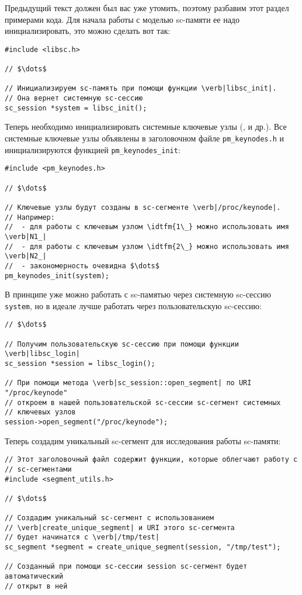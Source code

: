 Предыдущий текст должен был вас уже утомить, поэтому разбавим этот
раздел примерами кода. Для начала работы с моделью sc-памяти ее надо
инициализировать, это можно сделать вот так:

\begin{lstlisting}[texcl]
#include <libsc.h>

// $\dots$

// Инициализируем sc-память при помощи функции \verb|libsc_init|.
// Она вернет системную sc-сессию
sc_session *system = libsc_init();
\end{lstlisting}

Теперь необходимо инициализировать системные ключевые узлы (,
 и др.). Все системные ключевые узлы объявлены в заголовочном
файле \verb|pm_keynodes.h| и инициализируются функцией
\lstinline{pm_keynodes_init}:

\begin{lstlisting}[texcl]
#include <pm_keynodes.h>

// $\dots$

// Ключевые узлы будут созданы в sc-сегменте \verb|/proc/keynode|.
// Например:
//  - для работы с ключевым узлом \idtfm{1\_} можно использовать имя \verb|N1_|
//  - для работы с ключевым узлом \idtfm{2\_} можно использовать имя \verb|N2_|
//  - закономерность очевидна $\dots$
pm_keynodes_init(system);
\end{lstlisting}

В принципе уже можно работать с sc-памятью через системную sc-сессию
\lstinline{system}, но в идеале лучше работать через пользовательскую
sc-сессию:

\begin{lstlisting}[texcl]
// $\dots$

// Получим пользовательскую sc-сессию при помощи функции \verb|libsc_login|
sc_session *session = libsc_login();

// При помощи метода \verb|sc_session::open_segment| по URI "/proc/keynode"
// откроем в нашей пользовательской sc-сессии sc-сегмент системных
// ключевых узлов
session->open_segment("/proc/keynode");
\end{lstlisting}

Теперь создадим уникальный sc-сегмент для исследования работы
sc-памяти:

\begin{lstlisting}[texcl]
// Этот заголовочный файл содержит функции, которые облегчают работу с
// sc-сегментами
#include <segment_utils.h>

// $\dots$

// Создадим уникальный sc-сегмент с использованием
// \verb|create_unique_segment| и URI этого sc-сегмента
// будет начинатся с \verb|/tmp/test|
sc_segment *segment = create_unique_segment(session, "/tmp/test");

// Созданный при помощи sc-сессии session sc-сегмент будет автоматический
// открыт в ней
\end{lstlisting}

